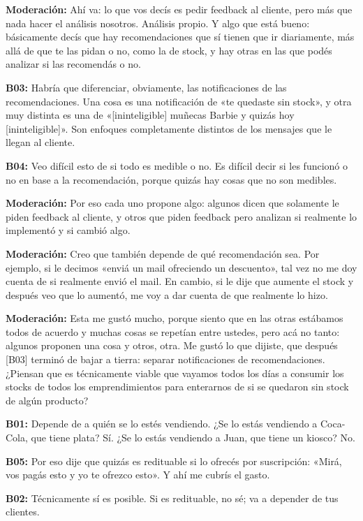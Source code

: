 \noindent\textbf{Moderación:} Ahí va: lo que vos decís es pedir feedback al cliente, pero más que nada hacer el análisis nosotros. Análisis propio. Y algo que está bueno: básicamente decís que hay recomendaciones que sí tienen que ir diariamente, más allá de que te las pidan o no, como la de stock, y hay otras en las que podés analizar si las recomendás o no.

\noindent\textbf{B03:} Habría que diferenciar, obviamente, las notificaciones de las recomendaciones. Una cosa es una notificación de «te quedaste sin stock», y otra muy distinta es una de «[ininteligible] muñecas Barbie y quizás hoy [ininteligible]». Son enfoques completamente distintos de los mensajes que le llegan al cliente.

\noindent\textbf{B04:} Veo difícil esto de si todo es medible o no. Es difícil decir si les funcionó o no en base a la recomendación, porque quizás hay cosas que no son medibles.

\noindent\textbf{Moderación:} Por eso cada uno propone algo: algunos dicen que solamente le piden feedback al cliente, y otros que piden feedback pero analizan si realmente lo implementó y si cambió algo.

\noindent\textbf{Moderación:} Creo que también depende de qué recomendación sea. Por ejemplo, si le decimos «enviá un mail ofreciendo un descuento», tal vez no me doy cuenta de si realmente envió el mail. En cambio, si le dije que aumente el stock y después veo que lo aumentó, me voy a dar cuenta de que realmente lo hizo.

\noindent\textbf{Moderación:} Esta me gustó mucho, porque siento que en las otras estábamos todos de acuerdo y muchas cosas se repetían entre ustedes, pero acá no tanto: algunos proponen una cosa y otros, otra. Me gustó lo que dijiste, que después [B03] terminó de bajar a tierra: separar notificaciones de recomendaciones. ¿Piensan que es técnicamente viable que vayamos todos los días a consumir los stocks de todos los emprendimientos para enterarnos de si se quedaron sin stock de algún producto?

\noindent\textbf{B01:} Depende de a quién se lo estés vendiendo. ¿Se lo estás vendiendo a Coca-Cola, que tiene plata? Sí. ¿Se lo estás vendiendo a Juan, que tiene un kiosco? No.

\noindent\textbf{B05:} Por eso dije que quizás es redituable si lo ofrecés por suscripción: «Mirá, vos pagás esto y yo te ofrezco esto». Y ahí me cubrís el gasto.

\noindent\textbf{B02:} Técnicamente sí es posible. Si es redituable, no sé; va a depender de tus clientes.

